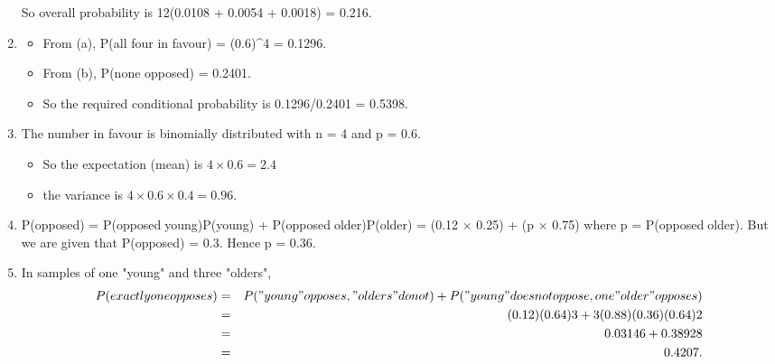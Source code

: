 \documentclass[a4paper,12pt]{article}
\begin{document}
\begin{enumerate}
So overall probability is 12(0.0108 + 0.0054 + 0.0018) = 0.216.
\item \begin{itemize}
    \item From (a), P(all four in favour) = (0.6)^4 = 0.1296.
    \item From (b), P(none
opposed) = 0.2401. 
\item So the required conditional probability is
0.1296/0.2401 = 0.5398.
\end{itemize} 
\item The number in favour is binomially distributed with n = 4 and p = 0.6. 
\begin{itemize}
    \item So the
expectation (mean) is $4 \times 0.6 = 2.4$ 
\item the variance is $4 \times 0.6 \times 0.4 = 0.96$.
\end{itemize}
\item P(opposed) = P(opposedyoung)P(young) + P(opposedolder)P(older)
= (0.12 × 0.25) + (p × 0.75)
where p = P(opposedolder). But we are given that P(opposed) = 0.3. Hence
p = 0.36.
\item In samples of one "young" and three "olders",
\begin{eqnarray*}
P(exactly one opposes) &=& P("young" opposes, "olders" do not)
 + P("young" does not oppose, one "older" opposes)\\
&=& {(0.12)(0.64)3} + {3(0.88)(0.36)(0.64)2}\\ &=& 0.03146 + 0.38928\\
&=& 0.4207.
\end{eqnarray*}
\end{enumerate}
\end{document}
